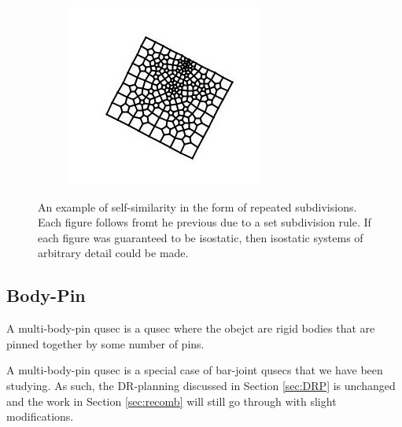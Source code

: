 \begin{figure}
\begin{subfigure}{0.25\linewidth}
    \end{subfigure}
    \begin{subfigure}{0.4\linewidth}
        \includegraphics[width=\linewidth]{img/pentl3}
    \end{subfigure}
    \caption{An example of self-similarity in the form of repeated subdivisions. Each figure follows fromt he previous due to a set subdivision rule. If each figure was guaranteed to be isostatic, then isostatic systems of arbitrary detail could be made.}
    \label{fig:subdivision}
\end{figure}

\subsection{Body-Pin}


\begin{definition}
    A multi-body-pin qusec is a qusec where the obejct are rigid bodies that are pinned together by some number of pins.
\end{definition}

\begin{remark}
    A multi-body-pin qusec is a special case of bar-joint qusecs that we have been studying. As such, the DR-planning discussed in Section \ref{sec:DRP} is unchanged and the work in Section \ref{sec:recomb} will still go through with slight modifications.
\end{remark}


